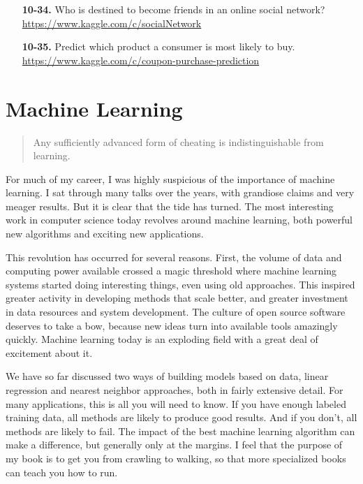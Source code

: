 \documentclass[10pt]{article}
\begin{document}
\begin{enumerate}
\begin{enumerate}
  \item[\textbf{10-34.}] Who is destined to become friends in an online social network? 
  \href{https://www.kaggle.com/c/socialNetwork}{https://www.kaggle.com/c/socialNetwork}

  \item[\textbf{10-35.}] Predict which product a consumer is most likely to buy. 
  \href{https://www.kaggle.com/c/coupon-purchase-prediction}{https://www.kaggle.com/c/coupon-purchase-prediction}

\end{enumerate}

\chapter*{Machine Learning}

\begin{abstract}
Any sufficiently advanced form of cheating is indistinguishable from learning.
\end{abstract}

\author{Jan Schaumann}

For much of my career, I was highly suspicious of the importance of machine learning. I sat through many talks over the years, with grandiose claims and very meager results. But it is clear that the tide has turned. The most interesting work in computer science today revolves around machine learning, both powerful new algorithms and exciting new applications.

This revolution has occurred for several reasons. First, the volume of data and computing power available crossed a magic threshold where machine learning systems started doing interesting things, even using old approaches. This inspired greater activity in developing methods that scale better, and greater investment in data resources and system development. The culture of open source software deserves to take a bow, because new ideas turn into available tools amazingly quickly. Machine learning today is an exploding field with a great deal of excitement about it.

We have so far discussed two ways of building models based on data, linear regression and nearest neighbor approaches, both in fairly extensive detail. For many applications, this is all you will need to know. If you have enough labeled training data, all methods are likely to produce good results. And if you don't, all methods are likely to fail. The impact of the best machine learning algorithm can make a difference, but generally only at the margins. I feel that the purpose of my book is to get you from crawling to walking, so that more specialized books can teach you how to run.


\end{enumerate}
\end{document}
